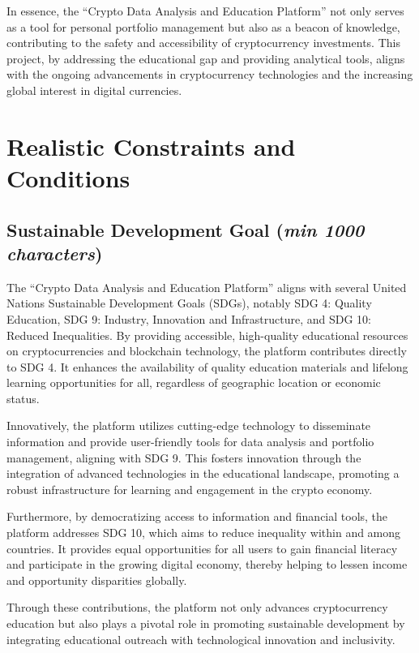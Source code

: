 \documentclass[12pt]{report}
\newcommand{\characters}[1]{(\textit{min #1 characters})}
\begin{document}
In essence, the ``Crypto Data Analysis and Education Platform'' not only serves as a tool for personal portfolio management but also as a beacon of knowledge, contributing to the safety and accessibility of cryptocurrency investments. This project, by addressing the educational gap and providing analytical tools, aligns with the ongoing advancements in cryptocurrency technologies and the increasing global interest in digital currencies.


\section{Realistic Constraints and Conditions}

\subsection{Sustainable Development Goal \characters{1000}}
The ``Crypto Data Analysis and Education Platform'' aligns with several United Nations Sustainable Development Goals (SDGs), notably SDG 4: Quality Education, SDG 9: Industry, Innovation and Infrastructure, and SDG 10: Reduced Inequalities. By providing accessible, high-quality educational resources on cryptocurrencies and blockchain technology, the platform contributes directly to SDG 4. It enhances the availability of quality education materials and lifelong learning opportunities for all, regardless of geographic location or economic status.

Innovatively, the platform utilizes cutting-edge technology to disseminate information and provide user-friendly tools for data analysis and portfolio management, aligning with SDG 9. This fosters innovation through the integration of advanced technologies in the educational landscape, promoting a robust infrastructure for learning and engagement in the crypto economy.

Furthermore, by democratizing access to information and financial tools, the platform addresses SDG 10, which aims to reduce inequality within and among countries. It provides equal opportunities for all users to gain financial literacy and participate in the growing digital economy, thereby helping to lessen income and opportunity disparities globally.

Through these contributions, the platform not only advances cryptocurrency education but also plays a pivotal role in promoting sustainable development by integrating educational outreach with technological innovation and inclusivity.
\end{document}
